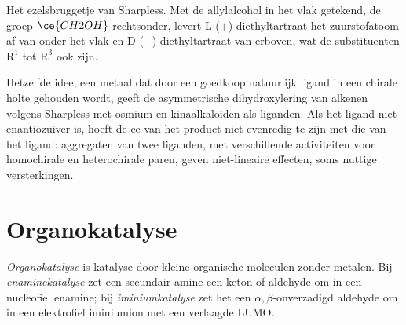 \begin{omfigure}

{\small Het ezelsbruggetje van Sharpless. Met de allylalcohol in het vlak
getekend, de groep
$\ce{CH2OH}$ rechtsonder, levert L-($+$)-diethyltartraat het zuurstofatoom af van
onder het vlak en D-($-$)-diethyltartraat van erboven, wat de
substituenten $\mathrm R^1$ tot $\mathrm R^3$ ook zijn.}
\end{omfigure}

Hetzelfde idee, een metaal dat door een goedkoop natuurlijk ligand in een
chirale holte gehouden wordt, geeft de asymmetrische dihydroxylering van
alkenen volgens Sharpless met osmium en kinaalkaloïden als liganden. Als
het ligand niet enantiozuiver is, hoeft de ee van het product niet
evenredig te zijn met die van het ligand: aggregaten van twee liganden,
met verschillende activiteiten voor homochirale en heterochirale paren,
geven niet-lineaire effecten, soms nuttige versterkingen.

\section{Organokatalyse}

\begin{definition}[Organokatalyse]\label{def:b3:asymmetric-synthesis:organocatalysis}
\emph{Organokatalyse} is katalyse door kleine
organische moleculen zonder metalen. Bij
\emph{enaminekatalyse} zet een secundair amine een
keton of aldehyde om in een nucleofiel enamine; bij
\emph{iminiumkatalyse} zet het een $\alpha,\beta$-onverzadigd
aldehyde om in een elektrofiel iminiumion met een verlaagde LUMO.
\end{definition}

